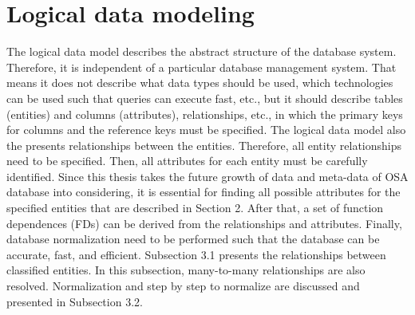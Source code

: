 \section{Logical data modeling}
The logical data model describes the abstract structure of the database system. Therefore, it is independent of a particular database management system. That means it does not describe what data types should be used, which technologies can be used such that queries can execute fast, etc., but it should describe tables (entities) and columns (attributes), relationships, etc., in which the primary keys for columns and the reference keys must be specified. The logical data model also the presents relationships between the entities. Therefore, all entity relationships need to be specified. Then, all attributes for each entity must be carefully identified. Since this thesis takes the future growth of data and meta-data of OSA database into considering, it is essential for finding all possible attributes for the specified entities that are described in Section 2. After that, a set of function dependences (FDs) can be derived from the relationships and attributes. Finally, database normalization need to be performed such that the database can be accurate, fast, and efficient. Subsection 3.1 presents the relationships between classified entities. In this subsection, many-to-many relationships are also resolved. Normalization and step by step to normalize are discussed and presented in Subsection 3.2.
